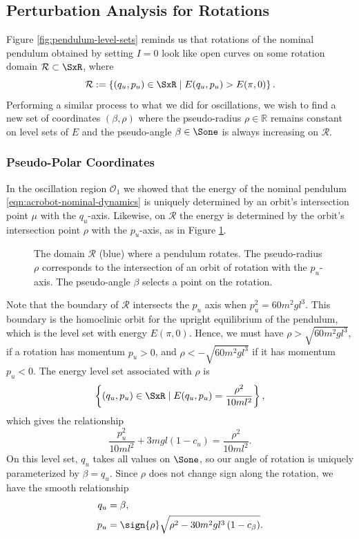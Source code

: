 \subsection{Perturbation Analysis for Rotations}
Figure \ref{fig:pendulum-level-sets} reminds us that rotations of the 
nominal pendulum obtained by setting \(I = 0\) look like open curves on some
rotation domain \(\mathcal{R} \subset \SxR\), where
\[
    \mathcal{R} := \left\{ (q_u,p_u) \in \SxR \mid E(q_u,p_u) > E(\pi,0)\right\}
    .
\]
Performing a similar process to what we did for oscillations,
we wish to find a new set of coordinates \((\beta,\rho)\)
where the pseudo-radius \(\rho \in \mathbb{R}\) remains constant on level sets
of \(E\) and the pseudo-angle \(\beta \in \Sone\) is always increasing on
\(\mathcal{R}\).

\subsubsection*{Pseudo-Polar Coordinates}

In the oscillation region \(\mathcal{O}_1\) we showed that the energy of the
nominal pendulum \eqref{eqn:acrobot-nominal-dynamics} is uniquely determined by
an orbit's intersection point \(\mu\) with the \(q_u\)-axis.
Likewise, on \(\mathcal{R}\) the energy is determined by the orbit's intersection
point \(\rho\) with the \(p_u\)-axis, as in Figure \ref{fig:rho-intersection}.

\begin{figure}
    \centering
    
    \caption{The domain \(\mathcal{R}\) (blue) where a pendulum rotates. The
        pseudo-radius \(\rho\) corresponds to the intersection of an orbit of
        rotation with the \(p_u\)-axis. The pseudo-angle \(\beta\) selects a
        point on the rotation.}
    \label{fig:rho-intersection}
\end{figure}

Note that the boundary of \(\mathcal{R}\) intersects the \(p_u\) axis when 
\(p_u^2 = 60m^2 g l^3\). 
This boundary is the homoclinic orbit for the
upright equilibrium of the pendulum, which is the level set with energy
\(E(\pi,0)\).
Hence, we must have \(\rho > \sqrt{60 m^2 g l^3}\), if a
rotation has momentum \(p_u > 0\), 
and \(\rho < -\sqrt{60 m^2 g l^3}\) if it has momentum \(p_u < 0\).
The energy level set associated with \(\rho\) is 
\[
    \left\{(q_u,p_u) \in \SxR \mid E(q_u,p_u) = \frac{\rho^2}{10ml^2}\right\}
    ,
\]
which gives the relationship
\begin{equation}\label{eqn:rotation-pu2}
    \frac{p_u^2}{10m l^2} + 3mgl(1 - c_u) = \frac{\rho^2}{10 ml^2}
    .
\end{equation}
On this level set, \(q_u\) takes all values on \(\Sone\), so our angle of
rotation is uniquely parameterized by \(\beta = q_u\).
Since \(\rho\) does not change sign along the rotation, we have the smooth
relationship
\begin{align}\label{eqn:rotation-Tinv}
    q_u &= \beta
    , \\
    p_u &= \sign{\rho}\sqrt{\rho^2 - 30 m^2 g l^3\left(1 - c_\beta \right)}
    .
\end{align}

